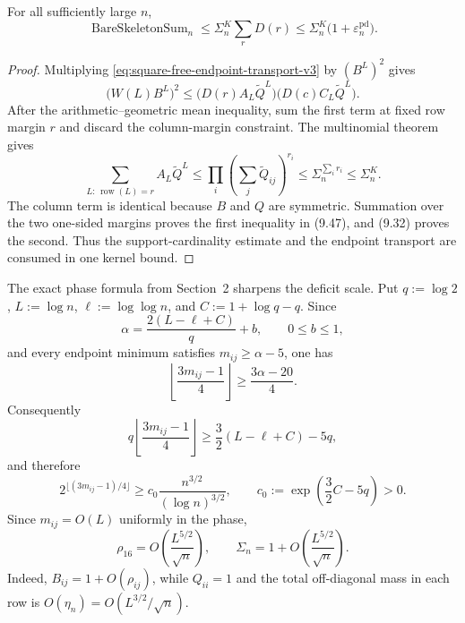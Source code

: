 \begin{proposition}
\label{prop:fused-deficit-endpoint-transport-v4}
For all sufficiently large $n$,
\begin{equation*}
  \operatorname{BareSkeletonSum}_n
  \le
  \Sigma_n^K\sum_rD(r)
  \le
  \Sigma_n^K\bigl(1+\varepsilon_n^{\mathrm{pd}}\bigr).
  \tag{9.47}
\end{equation*}
\end{proposition}

\begin{proof}
Multiplying \eqref{eq:square-free-endpoint-transport-v3} by $(B^L)^2$ gives
\[
  \bigl(W(L)B^L\bigr)^2
  \le
  \bigl(D(r)A_L\widetilde Q^L\bigr)
  \bigl(D(c)C_L\widetilde Q^L\bigr).
\]
After the arithmetic--geometric mean inequality, sum the first term at fixed
row margin $r$ and discard the column-margin constraint.  The multinomial
theorem gives
\[
  \sum_{L:\,\operatorname{row}(L)=r}A_L\widetilde Q^L
  \le
  \prod_i\left(\sum_j\widetilde Q_{ij}\right)^{r_i}
  \le
  \Sigma_n^{\sum_i r_i}
  \le
  \Sigma_n^K.
\]
The column term is identical because $B$ and $Q$ are symmetric.  Summation over
the two one-sided margins proves the first inequality in (9.47), and
(9.32) proves the second.  Thus the support-cardinality estimate and
the endpoint transport are consumed in one kernel bound.
\end{proof}

The exact phase formula from Section~2 sharpens the deficit scale.  Put
$q:=\log 2$, $L:=\log n$, $\ell:=\log\log n$, and
$C:=1+\log q-q$.  Since
\[
  \alpha=\frac{2(L-\ell+C)}q+b,
  \qquad 0\le b\le1,
\]
and every endpoint minimum satisfies $m_{ij}\ge\alpha-5$, one has
\[
  \left\lfloor\frac{3m_{ij}-1}{4}\right\rfloor
  \ge
  \frac{3\alpha-20}{4}.
\]
Consequently
\[
  q\left\lfloor\frac{3m_{ij}-1}{4}\right\rfloor
  \ge
  \frac32(L-\ell+C)-5q,
\]
and therefore
\begin{equation*}
  2^{\lfloor(3m_{ij}-1)/4\rfloor}
  \ge
  c_0\frac{n^{3/2}}{(\log n)^{3/2}},
  \qquad
  c_0:=\exp\!\left(\frac32C-5q\right)>0.
  \tag{9.48}
\end{equation*}
Since $m_{ij}=O(L)$ uniformly in the phase,
\begin{equation*}
  \rho_{16}
  =O\!\left(\frac{L^{5/2}}{\sqrt n}\right),
  \qquad
  \Sigma_n
  =1+O\!\left(\frac{L^{5/2}}{\sqrt n}\right).
  \tag{9.49}
\end{equation*}
Indeed, $B_{ij}=1+O(\rho_{ij})$, while $Q_{ii}=1$ and the total off-diagonal
mass in each row is $O(\eta_n)=O(L^{3/2}/\sqrt n)$.

